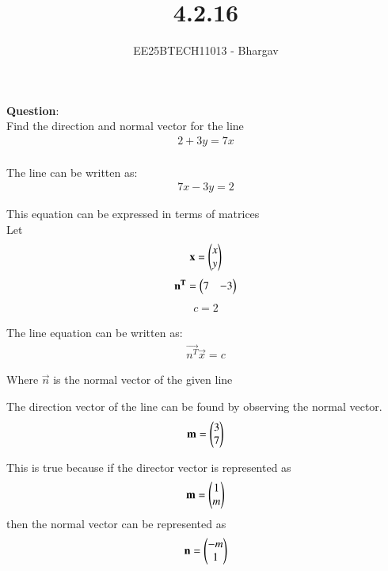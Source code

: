 \documentclass[journal]{IEEEtran}
\begin{document}

\vspace{3cm}

\title{4.2.16}
\author{EE25BTECH11013 - Bhargav}
\maketitle
{\let\newpage\relax\maketitle}

\renewcommand{\thefigure}{\theenumi}
\renewcommand{\thetable}{\theenumi}
\setlength{\intextsep}{10pt} %


\renewcommand{\thetable}{\theenumi}

\textbf{Question}:\\
Find the direction and normal vector for the line 
\begin{align}
2 + 3y = 7x
\end{align}
\solution \\

The line can be written as: 
\begin{align}
7x - 3y = 2
\end{align}

This equation can be expressed in terms of matrices\\
Let
\begin{align}
\mathbf{x} = \begin{pmatrix}x \\ y\end{pmatrix}
\end{align}
\begin{align}
\mathbf{n^T} = \begin{pmatrix}7 & -3\end{pmatrix}
\end{align}
\begin{align}
c = 2
\end{align}

The line equation can be written as:
\begin{align}
\vec{n^T}  \vec{x} = c
\end{align}

Where $\vec{n}$ is the normal vector of the given line

The direction vector of the line can be found by observing the normal vector.
\begin{align}
\mathbf{m} = \begin{pmatrix}3 \\ 7\end{pmatrix}
\end{align}


This is true because if the director vector is represented as 
\begin{align}
\mathbf{m}  = \begin{pmatrix}1 \\ m\end{pmatrix}    
\end{align}
then the normal vector can be represented as 
\begin{align}
\mathbf{n} = \begin{pmatrix}-m \\ 1\end{pmatrix}
\end{align}
\end{document}
